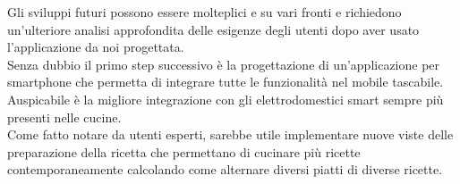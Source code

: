Gli sviluppi futuri possono essere molteplici e su vari fronti e richiedono un'ulteriore analisi approfondita delle esigenze degli utenti dopo aver usato l'applicazione da noi progettata.\\
Senza dubbio il primo step successivo è la progettazione di un'applicazione per smartphone che permetta di integrare tutte le funzionalità nel mobile tascabile. Auspicabile è la migliore integrazione con gli elettrodomestici smart sempre più presenti nelle cucine.\\
Come fatto notare da utenti esperti, sarebbe utile implementare nuove viste delle preparazione della ricetta che permettano di cucinare più ricette contemporaneamente calcolando come alternare diversi piatti di diverse ricette.\\